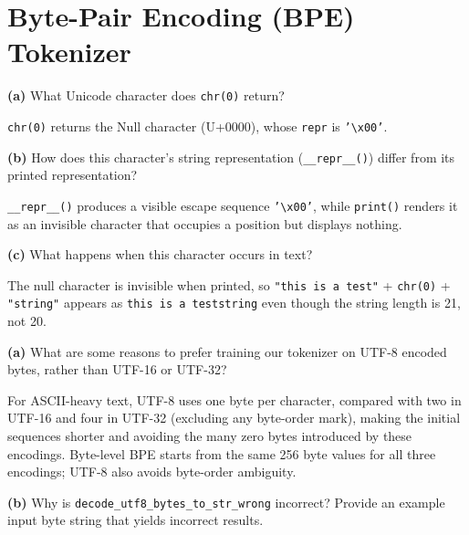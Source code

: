 \section{Byte-Pair Encoding (BPE) Tokenizer}


\textbf{(a)} What Unicode character does \texttt{chr(0)} return?


\texttt{chr(0)} returns the Null character (U+0000), whose \texttt{repr} is \texttt{'\textbackslash x00'}.

\textbf{(b)} How does this character's string representation (\texttt{\_\_repr\_\_()}) differ from its printed representation?


\texttt{\_\_repr\_\_()} produces a visible escape sequence \texttt{'\textbackslash x00'}, while \texttt{print()} renders it as an invisible character that occupies a position but displays nothing.

\textbf{(c)} What happens when this character occurs in text?


The null character is invisible when printed, so \texttt{"this is a test"}
+ \texttt{chr(0)} + \texttt{"string"}
appears as \texttt{this is a teststring} even though the string length is 21, not 20.



\textbf{(a)} What are some reasons to prefer training our tokenizer on UTF-8 encoded bytes, rather than UTF-16 or UTF-32?


For ASCII-heavy text, UTF-8 uses one byte per character, compared with two in UTF-16 and four in UTF-32 (excluding any byte-order mark), making the initial sequences shorter and avoiding the many zero bytes introduced by these encodings. Byte-level BPE starts from the same 256 byte values for all three encodings; UTF-8 also avoids byte-order ambiguity.

\textbf{(b)} Why is \texttt{decode\_utf8\_bytes\_to\_str\_wrong} incorrect? Provide an example input byte string that yields incorrect results.

